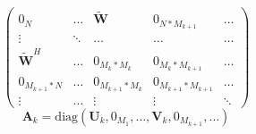 \documentclass[bachelor,nocolorlinks, printoneside]{seuthesis} %
\begin{document}
\begin{Main}
\begin{equation}
\left(
\begin{array}{ccccc}
0_N & \ldots & \tilde{\mathbf{W}} & 0_{N*M_{k+1}} & \ldots \\
\vdots & \ddots & \ldots & \ldots & \ldots \\
\tilde{\mathbf{W}}^H & \ldots & 0_{M_k * M_k} & 0_{M_k*M_{k+1}} & \ldots \\
0_{M_{k+1}*N} & \ldots & 0_{M_{k+1} *M_k} & 0_{M_{k+1}*M_{k+1}} & \ldots \\
\vdots & \ldots & \vdots & \vdots & \ddots
\end{array}
\right)
\end{equation}
\begin{equation}\label{key}
\mathbf{A}_k = \mathrm{diag}(\mathbf{U}_k,0_{M_1},\ldots,\mathbf{V}_k,0_{M_{k+1}},\ldots)
\end{equation}


\end{Main}
\end{document}
